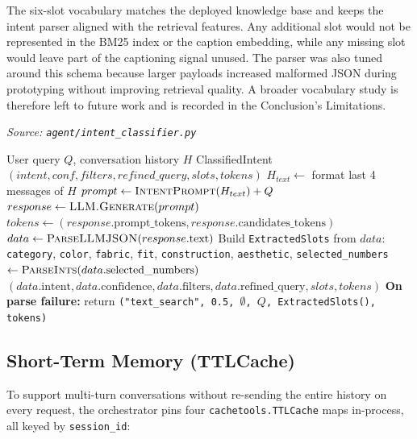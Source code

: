 The six-slot vocabulary matches the deployed knowledge base and keeps the intent parser aligned with the retrieval features. Any additional slot would not be represented in the BM25 index or the caption embedding, while any missing slot would leave part of the captioning signal unused. The parser was also tuned around this schema because larger payloads increased malformed JSON during prototyping without improving retrieval quality. A broader vocabulary study is therefore left to future work and is recorded in the Conclusion's Limitations.

\begin{algorithm}[H]
\caption{LLM-based Intent Classification with Six-Slot Extraction}\label{alg:intent_class}
\textit{Source: \texttt{agent/intent\_classifier.py}}
\begin{algorithmic}[1]
\Require User query $Q$, conversation history $H$
\Ensure ClassifiedIntent $(intent, conf, filters, refined\_query, slots, tokens)$
    \State $H_{text} \gets$ format last 4 messages of $H$
    \State $prompt \gets \textsc{IntentPrompt}(H_{text}) + Q$
    \State $response \gets \textsc{LLM.Generate}(prompt)$
    \State $tokens \gets (response.\text{prompt\_tokens}, response.\text{candidates\_tokens})$
    \State $data \gets \textsc{ParseLLMJSON}(response.\text{text})$
    \State Build \texttt{ExtractedSlots} from $data$:
    \Statex \quad\quad \texttt{category}, \texttt{color}, \texttt{fabric}, \texttt{fit},
    \Statex \quad\quad \texttt{construction}, \texttt{aesthetic},
    \Statex \quad\quad \texttt{selected\_numbers} $\gets \textsc{ParseInts}(data.\text{selected\_numbers})$
    \State \Return $(data.\text{intent}, data.\text{confidence}, data.\text{filters}, data.\text{refined\_query}, slots, tokens)$
\EndFunction
\State \textbf{On parse failure:} return \texttt{("text\_search", 0.5, $\emptyset$, $Q$, ExtractedSlots(), tokens)}
\end{algorithmic}
\end{algorithm}

\subsection{Short-Term Memory (TTLCache)}
\label{subsec:ttlcache}

To support multi-turn conversations without re-sending the entire history on every request, the orchestrator pins four \texttt{cachetools.TTLCache} maps in-process, all keyed by \texttt{session\_id}:

